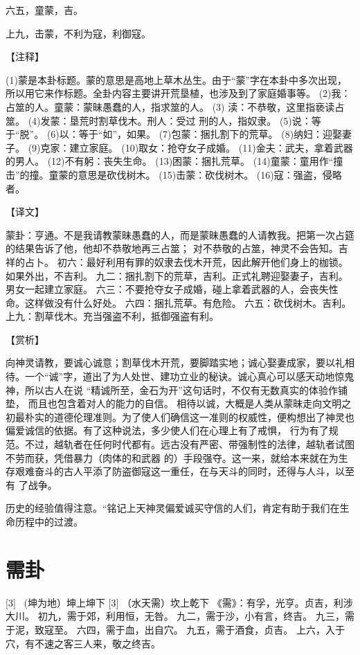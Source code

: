 \documentclass[12pt,UTF8]{ctexbook}
\begin{document}
六五，童蒙，吉。

上九，击蒙，不利为寇，利御寇。

【注释】

(1)蒙是本卦标题。蒙的意思是高地上草木丛生。由于“蒙”字在本卦中多次出现，所以用它来作标题。全卦内容主要讲开荒垦植，也涉及到了家庭婚事等。
(2)我：占筮的人。童蒙：蒙昧愚蠢的人，指求筮的人。
(3) 渎：不恭敬，这里指亵读占筮。
(4)发蒙：垦荒时割草伐木。刑人：受过 刑的人，指奴隶。
(5)说：等于“脱”。
(6)以：等于“如”，如果。
(7)包蒙：捆扎割下的荒草。
(8)纳妇：迎娶妻子。
(9)克家：建立家庭。
(10)取女：抢夺女子成婚。
(11)金夫：武夫，拿着武器的男人。
(12)不有躬：丧失生命。
(13)困蒙：捆扎荒草。
(14)童蒙：童用作“撞击”的撞。童蒙的意思是砍伐树木。
(15)击蒙：砍伐树木。
(16)寇：强盗，侵略者。

【译文】

蒙卦：亨通。不是我请教蒙昧愚蠢的人，而是蒙昧愚蠢的人请教我。把第一次占筵的结果告诉了他，他却不恭敬地再三占筮； 对不恭敬的占筮，神灵不会告知。吉祥的占卜。
初六：最好利用有罪的奴隶去伐木开荒，因此解开他们身上的枷锁。如果外出，不吉利。
九二：捆扎割下的荒草，吉利。正式礼聘迎娶妻子，吉利。男女一起建立家庭。
六三：不要抢夺女子成婚，碰上拿着武器的人，会丧失性命。这样做没有什么好处。
六四：捆扎荒草。有危险。
六五：砍伐树木。吉利。
上九：割草伐木。充当强盗不利，抵御强盗有利。

【赏析】

向神灵请教，要诚心诚意；割草伐木开荒，要脚踏实地；诚心娶妻成家，要以礼相待。一个“诚”字，道出了为人处世、建功立业的秘诀。诚心真心可以感天动地惊鬼神，所以古人在说 “精诚所至，金石为开”这句话时，不仅有无数真实的体验作铺垫， 而且也包含着对人的能力的自信。 相待以诚，大概是人类从蒙昧走向文明之初最朴实的道德伦理准则。为了使人们确信这一准则的权威性，便构想出了神灵也 偏爱诚信的依据。有了这种说法，多少使人们在心理上有了戒惧， 行为有了规范。不过，越轨者在任何时代都有。远古没有严密、带强制性的法律，越轨者试图不劳而获，凭借暴力（肉体的和武器 的）手段强夺。这一来，就给本来就在为生存艰难奋斗的古人平添了防盗御寇这一重任，在与天斗的同时，还得与人斗，以至有 了战争。

历史的经验值得注意。“铭记上天神灵偏爱诚买守信的人们，肯定有助于我们在生命历程中的过渡。

\chapter{需卦}
[3] \ (坤为地）坤上坤下
[3]
（水天需）坎上乾下
《需》：有孚，光亨。贞吉，利涉大川。
初九，需于郊，利用恒，无咎。
九二，需于沙，小有言，终吉。
九三，需于泥，致寇至。
六四，需于血，出自穴。
九五，需于酒食，贞吉。
上六，入于穴，有不速之客三人来，敬之终吉。
\end{document}
